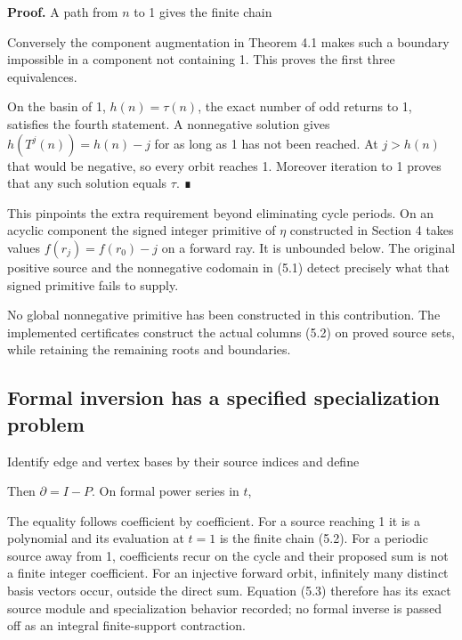 \textbf{Proof.} A path from \(n\) to 1 gives the finite chain


Conversely the component augmentation in Theorem 4.1 makes such a
boundary impossible in a component not containing 1. This proves the
first three equivalences.

On the basin of 1, \(h(n)=\tau(n)\), the exact number of odd returns to
1, satisfies the fourth statement. A nonnegative solution gives
\(h(T^j(n))=h(n)-j\) for as long as 1 has not been reached. At
\(j>h(n)\) that would be negative, so every orbit reaches 1. Moreover
iteration to 1 proves that any such solution equals \(\tau\). ∎

This pinpoints the extra requirement beyond eliminating cycle periods.
On an acyclic component the signed integer primitive of \(\eta\)
constructed in Section 4 takes values \(f(r_j)=f(r_0)-j\) on a forward
ray. It is unbounded below. The original positive source and the
nonnegative codomain in (5.1) detect precisely what that signed
primitive fails to supply.

No global nonnegative primitive has been constructed in this
contribution. The implemented certificates construct the actual columns
(5.2) on proved source sets, while retaining the remaining roots and
boundaries.

\subsection{Formal inversion has a specified specialization problem}

Identify edge and vertex bases by their source indices and define


Then \(\partial=I-P\). On formal power series in \(t\),


The equality follows coefficient by coefficient. For a source reaching 1
it is a polynomial and its evaluation at \(t=1\) is the finite chain
(5.2). For a periodic source away from 1, coefficients recur on the
cycle and their proposed sum is not a finite integer coefficient. For an
injective forward orbit, infinitely many distinct basis vectors occur,
outside the direct sum. Equation (5.3) therefore has its exact source
module and specialization behavior recorded; no formal inverse is passed
off as an integral finite-support contraction.

